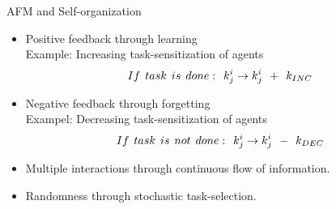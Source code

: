 \documentclass{beamer}
\begin{document}
\begin{frame}[t]{AFM and Self-organization}
  \begin{itemize}
    \item \alert{Positive feedback} through learning\\ Example: Increasing task-sensitization of agents
\begin{equation}
 If\hspace*{0.15cm}task\hspace*{0.15cm}is\hspace*{0.15cm}done:\hspace*{0.15cm}  k^i_j \rightarrow   k^i_j \hspace*{0.15cm} + \hspace*{0.15cm} k_{INC}
\label{eqn:k-inc}
\end{equation} 
    \item \alert{Negative feedback} through forgetting\\ Exampel: Decreasing task-sensitization of agents
\begin{equation}
 If\hspace*{0.15cm}task\hspace*{0.15cm}is\hspace*{0.15cm}not\hspace*{0.15cm}done:\hspace*{0.15cm}  k^i_j \rightarrow   k^i_j \hspace*{0.15cm} - \hspace*{0.15cm} k_{DEC}
\label{eqn:k-dec}
\end{equation}   	
	\item \alert{Multiple interactions} through continuous flow of information.
	
	\item \alert{Randomness} through stochastic task-selection.
    \end{itemize}
\end{frame}
\end{document}
